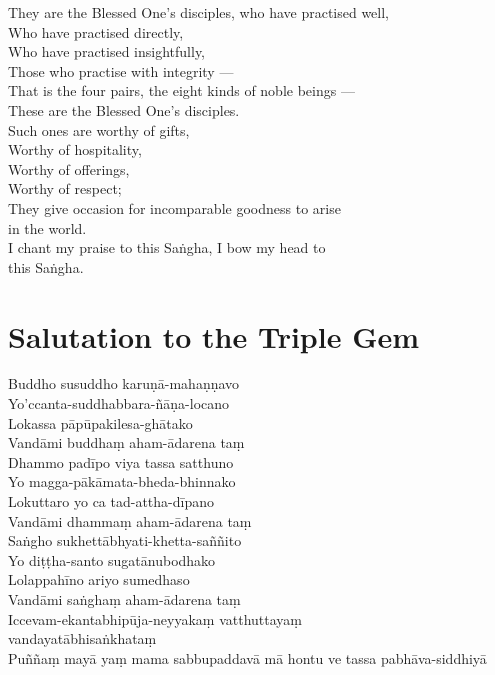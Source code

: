 They are the Blessed One's disciples, who have practised well,\\
Who have practised directly,\\
Who have practised insightfully,\\
Those who practise with integrity ---\\
That is the four pairs, the eight kinds of noble beings ---\\
These are the Blessed One's disciples.\\
Such ones are worthy of gifts,\\
Worthy of hospitality,\\
Worthy of offerings,\\
Worthy of respect;\\
They give occasion for incomparable goodness to arise \\in the world.\\
I chant my praise to this Saṅgha, I bow my head to\\ this Saṅgha.

\section*{Salutation to the Triple Gem}

\begin{leader}
\end{leader}


Buddho susuddho karuṇā-mahaṇṇavo\\
Yo'ccanta-suddhabbara-ñāṇa-locano\\
Lokassa pāpūpakilesa-ghātako\\
Vandāmi buddhaṃ aham-ādarena taṃ\\
Dhammo padīpo viya tassa satthuno\\
Yo magga-pākāmata-bheda-bhinnako\\
Lokuttaro yo ca tad-attha-dīpano\\
Vandāmi dhammaṃ aham-ādarena taṃ\\
Saṅgho sukhettābhyati-khetta-saññito\\
Yo diṭṭha-santo sugatānubodhako\\
Lolappahīno ariyo sumedhaso\\
Vandāmi saṅghaṃ aham-ādarena taṃ\\
Iccevam-ekantabhipūja-neyyakaṃ vatthuttayaṃ \\vandayatābhisaṅkhataṃ\\
Puññaṃ mayā yaṃ mama sabbupaddavā mā hontu ve tassa pabhāva-siddhiyā


